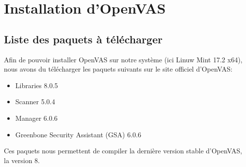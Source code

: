 \section{Installation d'OpenVAS}
\subsection{Liste des paquets à télécharger}
Afin de pouvoir installer OpenVAS sur notre système (ici Linuw Mint 17.2 x64), nous avons du télécharger les paquets suivants sur le site officiel d'OpenVAS\cite{OVDL}:
\begin{itemize}
 \item Libraries 8.0.5
 \item Scanner 5.0.4
 \item Manager 6.0.6
 \item Greenbone Security Assistant (GSA) 6.0.6
\end{itemize}
Ces paquets nous permettent de compiler la dernière version stable d'OpenVAS, la version 8.
